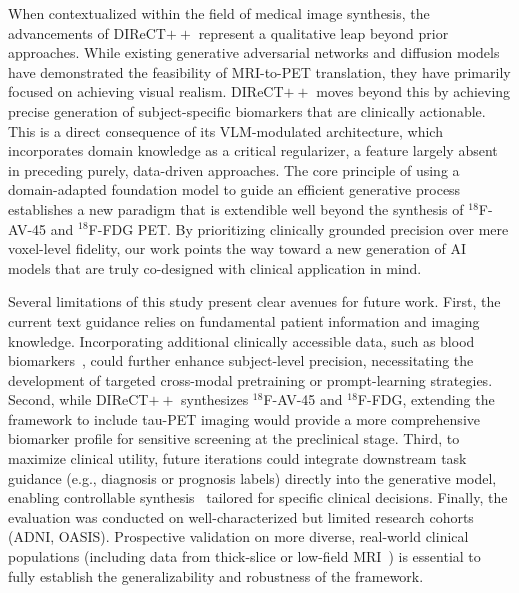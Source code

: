 \documentclass{article}
\begin{document}
When contextualized within the field of medical image synthesis, the advancements of DIReCT$++$ represent a qualitative leap beyond prior approaches. While existing generative adversarial networks and diffusion models have demonstrated the feasibility of MRI-to-PET translation, they have primarily focused on achieving visual realism. DIReCT$++$ moves beyond this by achieving precise generation of subject-specific biomarkers that are clinically actionable. This is a direct consequence of its VLM-modulated architecture, which incorporates domain knowledge as a critical regularizer, a feature largely absent in preceding purely, data-driven approaches. The core principle of using a domain-adapted foundation model to guide an efficient generative process establishes a new paradigm that is extendible well beyond the synthesis of $^{18}$F-AV-45 and $^{18}$F-FDG PET. By prioritizing clinically grounded precision over mere voxel-level fidelity, our work points the way toward a new generation of AI models that are truly co-designed with clinical application in mind.

Several limitations of this study present clear avenues for future work. First, the current text guidance relies on fundamental patient information and imaging knowledge. Incorporating additional clinically accessible data, such as blood biomarkers~\cite{hansson2023blood}, could further enhance subject-level precision, necessitating the development of targeted cross-modal pretraining or prompt-learning strategies. Second, while DIReCT$++$ synthesizes $^{18}$F-AV-45 and $^{18}$F-FDG, extending the framework to include tau-PET imaging would provide a more comprehensive biomarker profile for sensitive screening at the preclinical stage. Third, to maximize clinical utility, future iterations could integrate downstream task guidance (e.g., diagnosis or prognosis labels) directly into the generative model, enabling controllable synthesis~\cite{wang2025flexibly,chang2025controllable} tailored for specific clinical decisions. Finally, the evaluation was conducted on well-characterized but limited research cohorts (ADNI, OASIS). Prospective validation on more diverse, real-world clinical populations (including data from thick-slice or low-field MRI~\cite{sorby2024portable}) is essential to fully establish the generalizability and robustness of the framework.
\end{document}
